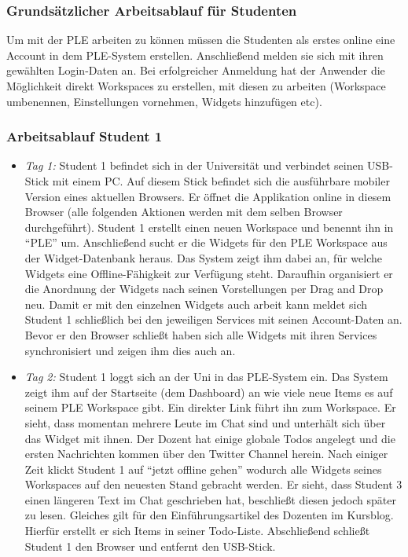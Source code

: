 \subsubsection{Grundsätzlicher Arbeitsablauf für Studenten}
Um mit der PLE arbeiten zu können müssen die Studenten als erstes online eine Account in dem PLE-System erstellen. Anschließend melden sie sich mit ihren gewählten Login-Daten an. Bei erfolgreicher Anmeldung hat der Anwender die Möglichkeit direkt Workspaces zu erstellen, mit diesen zu arbeiten (Workspace umbenennen, Einstellungen vornehmen, Widgets hinzufügen etc).

\subsubsection{Arbeitsablauf Student 1}
\begin{itemize}
 \item \emph{Tag 1:} Student 1 befindet sich in der Universität und verbindet seinen USB-Stick mit einem PC. Auf diesem Stick befindet sich die ausführbare mobiler Version eines aktuellen Browsers. Er öffnet die Applikation online in diesem Browser (alle folgenden Aktionen werden mit dem selben Browser durchgeführt). Student 1 erstellt einen neuen Workspace und benennt ihn in "`PLE"' um. Anschließend sucht er die Widgets für den PLE Workspace aus der Widget-Datenbank heraus. Das System zeigt ihm dabei an, für welche Widgets eine Offline-Fähigkeit zur Verfügung steht. Daraufhin organisiert er die Anordnung der Widgets nach seinen Vorstellungen per Drag and Drop neu. Damit er mit den einzelnen Widgets auch arbeit kann meldet sich Student 1 schließlich bei den jeweiligen Services mit seinen Account-Daten an. Bevor er den Browser schließt haben sich alle Widgets mit ihren Services synchronisiert und zeigen ihm dies auch an.
 \item \emph{Tag 2:} Student 1 loggt sich an der Uni in das PLE-System ein. Das System zeigt ihm auf der Startseite (dem Dashboard) an wie viele neue Items es auf seinem PLE Workspace gibt. Ein direkter Link führt ihn zum Workspace. Er sieht, dass momentan mehrere Leute im Chat sind und unterhält sich über das Widget mit ihnen. Der Dozent hat einige globale Todos angelegt und die ersten Nachrichten kommen über den Twitter Channel herein. Nach einiger Zeit klickt Student 1 auf “jetzt offline gehen” wodurch alle Widgets seines Workspaces auf den neuesten Stand gebracht werden. Er sieht, dass Student 3 einen längeren Text im Chat geschrieben hat, beschließt diesen jedoch später zu lesen. Gleiches gilt für den Einführungsartikel des Dozenten im Kursblog. Hierfür erstellt er sich Items in seiner Todo-Liste. Abschließend schließt Student 1 den Browser und entfernt den USB-Stick.

\end{itemize}
